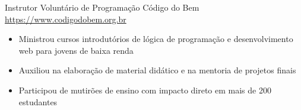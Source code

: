 \documentclass[a4paper, serif, 10pt]{moderncv}
\begin{document}
        {Instrutor Voluntário de Programação}
        {Código do Bem}
        {\url{https://www.codigodobem.org.br}}
        {}
        {\begin{itemize}
\item Ministrou cursos introdutórios de lógica de programação e desenvolvimento web para jovens de baixa renda
\item Auxiliou na elaboração de material didático e na mentoria de projetos finais
\item Participou de mutirões de ensino com impacto direto em mais de 200 estudantes
\end{itemize}}
\end{document}
